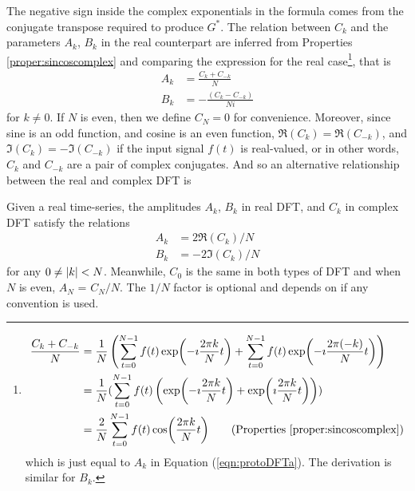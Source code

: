 The negative sign inside the complex exponentials in the formula comes from the conjugate transpose required to produce $G^*$. The relation between $C_k$ and the parameters $A_k$, $B_k$ in the real counterpart are inferred from Properties \ref{proper:sincoscomplex} and comparing the expression for the real case\footnote{\begin{align*}
\frac{C_k + C_{-k}}{N} &= \frac{1}{N}\left(\sum_{t=0}^{N-1} f(t)\exp(-\imath\frac{2\pi k}{N}t) + \sum_{t=0}^{N-1} f(t)\exp(-\imath\frac{2\pi (-k)}{N}t)\right) \\ 
&= \frac{1}{N}(\sum_{t=0}^{N-1} f(t)\left(\exp(-\imath\frac{2\pi k}{N}t) + \exp(\imath\frac{2\pi k}{N}t)\right)) \\
&= \frac{2}{N} \sum_{t=0}^{N-1} f(t) \cos(\frac{2\pi k}{N}t) \qquad \text{(Properties \ref{proper:sincoscomplex})}
\end{align*}
which is just equal to $A_k$ in Equation (\ref{eqn:protoDFTa}). The derivation is similar for $B_k$.}, that is
\begin{align*}
A_k &= \frac{C_k + C_{-k}}{N} \\
B_k &= -\frac{(C_k - C_{-k})}{N i}
\end{align*}
for $k \neq 0$. If $N$ is even, then we define $C_N = 0$ for convenience. Moreover, since sine is an odd function, and cosine is an even function, $\Re(C_k) = \Re(C_{-k})$, and $\Im(C_k) = -\Im(C_{-k})$ if the input signal $f(t)$ is real-valued, or in other words, $C_k$ and $C_{-k}$ are a pair of complex conjugates. And so an alternative relationship between the real and complex DFT is
\begin{proper}
\label{proper:FTrealcomplex}
Given a real time-series, the amplitudes $A_k$, $B_k$ in real DFT, and $C_k$ in complex DFT satisfy the relations
\begin{align*}
A_k &= 2\Re(C_k)/N \\
B_k &= -2\Im(C_k)/N
\end{align*}
for any $0 \neq \abs{k} < N$. Meanwhile, $C_0$ is the same in both types of DFT and when $N$ is even, $A_N$ = $C_N/N$. The $1/N$ factor is optional and depends on if any convention is used.
\end{proper}

